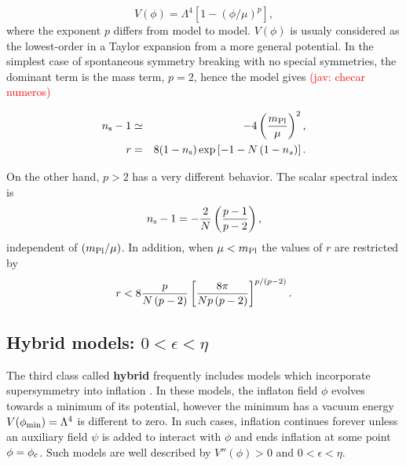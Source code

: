 \documentclass{rmaa}
\def\bea{\begin{eqnarray}}
\def\eea{\end{eqnarray}}
\newcommand{\jav}[1]{\textcolor{red}{(jav: #1)}}
\begin{document}
\begin{equation}
V\left(\phi\right) = \Lambda^4 \left[1 - \left(\phi / \mu\right)^p\right],
\end{equation}
%
where the exponent $p$ differs from model to model. $V(\phi)$ is usualy considered as the 
lowest-order in a Taylor expansion from a more general potential.
In the simplest case of spontaneous symmetry breaking with no special symmetries, 
the dominant term is the mass term, $p = 2$, hence the model gives \jav{checar numeros}

\bea
n_{\rm s}-1&\simeq& -4\left( \frac{m_{\rm Pl}}{\mu}\right)^2, \nonumber \\
r &=& 8 (1 - n_{\rm s}) \exp\left[- 1 - N\left(1 - n_s\right)\right].
\eea

%
%
On the other
hand, $p > 2$ has a very different behavior. The scalar spectral index is
\begin{equation}
n_{\rm s}-1 = - {2 \over N} \left({p - 1 \over p - 2}\right),
\end{equation}
independent of $(m_{\rm Pl}/\mu)$. In addition, when $\mu < m_{\rm Pl}$ 
the values of $r$ are restricted by
\begin{equation}
r < 8 {p \over N \left(p - 2\right)} \left[{8 \pi \over N p \left(p -
2\right)}\right]^{p / \left(p - 2\right)}.
\end{equation}



\subsection{Hybrid models: $0 < \epsilon < \eta$}

The third class called \textbf{hybrid} frequently includes
models which incorporate supersymmetry into inflation \citep{Linde3, Copeland}. 
In these models, the inflaton field $\phi$ evolves
towards a minimum of its potential, however the minimum has a vacuum energy 
$V(\phi_{\rm min}) = \Lambda^4$ is different to zero. 
In such cases, inflation continues forever unless an
auxiliary field $\psi$ is added to interact with $\phi$ and ends inflation at some point $\phi = \phi_{\rm c}$. 
 Such models are well described by $V''\left(\phi\right) > 0$ and $0 < \epsilon < \eta$. 
\\
\end{document}
